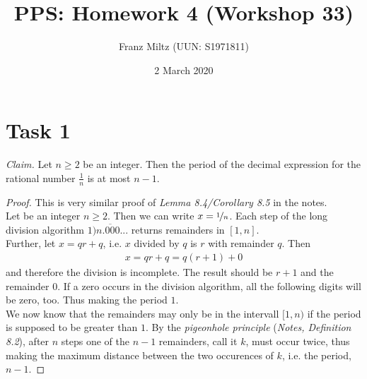 \documentclass{article}
\title{PPS: Homework 4 (Workshop 33)}
\author{Franz Miltz (UUN: S1971811)}
\date{2 March 2020}
\begin{document}
\maketitle
\section*{Task 1}
\emph{Claim.} Let $n\geq 2$ be an integer. Then the period of the decimal expression for the rational number $\frac{1}{n}$ is at most $n-1$.
\begin{proof}
  This is very similar proof of \emph{Lemma 8.4/Corollary 8.5} in the notes.\\
  Let be an integer $n\geq 2$. Then we can write $x=\nicefrac{1}{n}$. Each step of the long division algorithm $1\overline{)n.000...}$ returns remainders in $[1,n]$.\\
  Further, let $x=qr+q$, i.e. $x$ divided by $q$ is $r$ with remainder $q$. Then
  \begin{align*}
    x = qr+q = q(r+1)+0
  \end{align*}
  and therefore the division is incomplete. The result should be $r+1$ and the remainder $0$. If a zero occurs in the division algorithm, all the following digits will be zero, too. Thus making the period $1$.\\
  We now know that the remainders may only be in the intervall $[1, n)$ if the period is supposed to be greater than $1$. By the \emph{pigeonhole principle} (\emph{Notes, Definition 8.2}), after $n$ steps one of the $n-1$ remainders, call it $k$, must occur twice, thus making the maximum distance between the two occurences of $k$, i.e. the period, $n-1$.

\end{proof}
\end{document}
